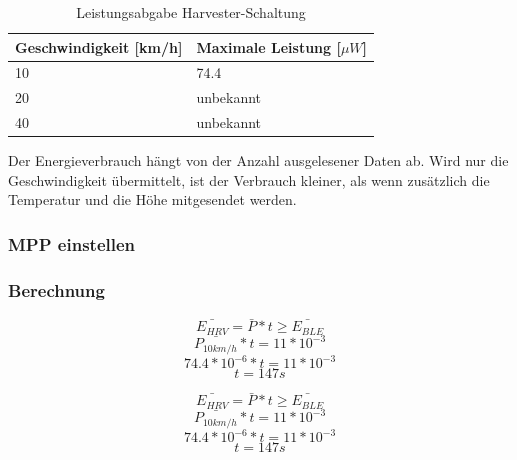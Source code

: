\begin{table}[ht]
\begin{tabular}{|l|l|}\hline \label{MPP_Werte} 
    Geschwindigkeit [km/h] & Maximale Leistung [$\mu W$] \\ \hline
    10 & 74.4 \\ \hline
    20 & unbekannt \\ \hline
    40 & unbekannt \\ \hline
\end{tabular}
\caption{Leistungsabgabe Harvester-Schaltung}
\end{table}

Der Energieverbrauch hängt von der Anzahl ausgelesener Daten ab. Wird nur die Geschwindigkeit übermittelt, ist der Verbrauch kleiner, als wenn zusätzlich die Temperatur und die Höhe mitgesendet werden.


\subsubsection{MPP einstellen}

%
% 
%

\subsubsection*{Berechnung}

\[\bar{E_{HRV}} = \bar{P} * t \ge \bar{E_{BLE}}  \]
\[\bar{P_{10km/h}} * t = 11 * 10^{-3}  \]
\[74.4 * 10^{-6} * t = 11 * 10^{-3}   \]
\[t = 147 s  \]

\[\bar{E_{HRV}} = \bar{P} * t \ge \bar{E_{BLE}}  \]
\[\bar{P_{10km/h}} * t = 11 * 10^{-3}  \]
\[74.4 * 10^{-6} * t = 11 * 10^{-3}   \]
\[t = 147 s  \]

